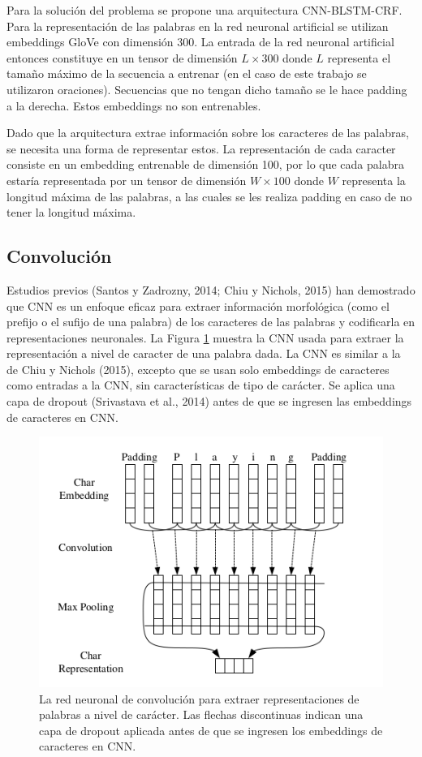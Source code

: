 \documentclass[runningheads]{llncs}
\begin{document}
Para la solución del problema se propone una arquitectura CNN-BLSTM-CRF. Para la representación
de las palabras en la red neuronal artificial se utilizan embeddings GloVe con dimensión 300.
La entrada de la red neuronal artificial entonces constituye en un tensor de dimensión 
$L \times 300$ donde $L$ representa el tamaño máximo de la secuencia a entrenar (en el caso de este trabajo
se utilizaron oraciones). Secuencias que no tengan dicho tamaño se le hace padding a la derecha. 
Estos embeddings no son entrenables.

Dado que la arquitectura extrae información sobre los caracteres de las palabras, se necesita
una forma de representar estos. La representación de cada caracter consiste en un embedding
entrenable de dimensión 100, por lo que cada palabra estaría representada por un tensor de
dimensión $W \times 100$ donde $W$ representa la longitud máxima de las palabras, a las cuales se
les realiza padding en caso de no tener la longitud máxima.

\subsection{Convolución}

Estudios previos (Santos y Zadrozny, 2014; Chiu y Nichols, 2015) han demostrado que CNN es un 
enfoque eficaz para extraer información morfológica (como el prefijo o el sufijo de una palabra) 
de los caracteres de las palabras y codificarla en representaciones neuronales. La Figura \ref{F1} muestra 
la CNN usada para extraer la representación a nivel de caracter de una palabra dada. La CNN 
es similar a la de Chiu y Nichols (2015), excepto que se usan solo embeddings de caracteres como 
entradas a la CNN, sin características de tipo de carácter. Se aplica una capa de dropout
(Srivastava et al., 2014) antes de que se ingresen las embeddings de caracteres en CNN.

\begin{figure}
	\centering
	\includegraphics[width=12cm]{Fig_1.png}
	\caption{ La red neuronal de convolución para extraer representaciones de palabras 
	a nivel de carácter. Las flechas discontinuas indican una capa de dropout aplicada antes 
	de que se ingresen los embeddings de caracteres en CNN.}
	\label{F1}
\end{figure}
\end{document}
